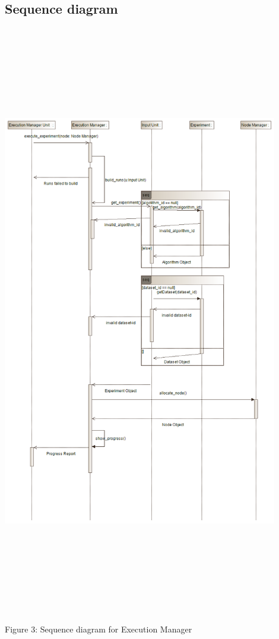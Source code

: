 \subsection{Sequence diagram}
    \includegraphics[width=12cm,height=26cm,keepaspectratio]{execution_manager/images/execution_manager_sequence_diagram.png}
	\begin{center}
	    \small{Figure 3: Sequence diagram for Execution Manager}
    \end{center}

